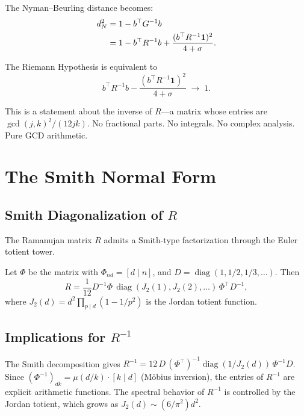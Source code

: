 \documentclass[11pt,a4paper]{article}
\begin{document}
\noindent
The Nyman--Beurling distance becomes:
\begin{align}
  d_N^2 &= 1 - b^\top G^{-1} b \notag \\
  &= 1 - b^\top R^{-1} b
    + \frac{(b^\top R^{-1} \mathbf{1})^2}{4 + \sigma}.
  \label{eq:glass-distance}
\end{align}

\begin{corollary}
The Riemann Hypothesis is equivalent to
\begin{equation}
\label{eq:rh-glass}
  b^\top R^{-1} b
    - \frac{(b^\top R^{-1} \mathbf{1})^2}{4 + \sigma}
  \;\longrightarrow\; 1.
\end{equation}
\end{corollary}

\noindent
This is a statement about the inverse of $R$---a matrix whose
entries are $\gcd(j,k)^2/(12jk)$. No fractional parts.
No integrals. No complex analysis. Pure GCD arithmetic.

\section{The Smith Normal Form}
\label{sec:smith}

\subsection{Smith Diagonalization of $R$}

The Ramanujan matrix $R$ admits a Smith-type factorization
through the Euler totient tower.

\begin{theorem}
\label{thm:smith}
Let $\Phi$ be the matrix with $\Phi_{nd} = [d \mid n]$, and
$D = \operatorname{diag}(1, 1/2, 1/3, \ldots)$. Then
\[
  R = \frac{1}{12} D^{-1} \Phi\,
    \operatorname{diag}(J_2(1), J_2(2), \ldots)\,
    \Phi^\top D^{-1},
\]
where $J_2(d) = d^2 \prod_{p \mid d}(1 - 1/p^2)$ is the
Jordan totient function.
\end{theorem}

\subsection{Implications for $R^{-1}$}

The Smith decomposition gives
$R^{-1} = 12\,D\,(\Phi^\top)^{-1}
\operatorname{diag}(1/J_2(d))\,\Phi^{-1} D$.
Since $(\Phi^{-1})_{dk} = \mu(d/k)\cdot[k \mid d]$
(M\"obius inversion), the entries of $R^{-1}$ are explicit
arithmetic functions. The spectral behavior of $R^{-1}$ is
controlled by the Jordan totient, which grows as
$J_2(d) \sim (6/\pi^2) d^2$.
\end{document}
